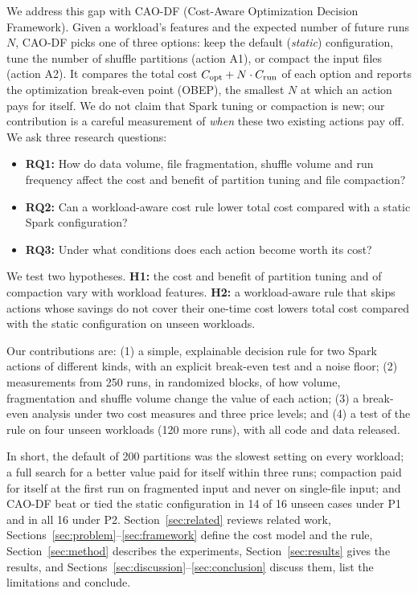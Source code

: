 We address this gap with CAO-DF (Cost-Aware Optimization Decision Framework). Given a
workload's features and the expected number of future runs $N$, CAO-DF picks one of three
options: keep the default (\emph{static}) configuration, tune the number of shuffle partitions
(action A1), or compact the input files (action A2). It compares the total cost
$C_{\mathrm{opt}} + N \cdot C_{\mathrm{run}}$ of each option and reports the optimization break-even point (OBEP),
the smallest $N$ at which an action pays for itself. We do not claim that Spark tuning or
compaction is new; our contribution is a careful measurement of \emph{when} these two
existing actions pay off. We ask three research questions:
\begin{itemize}
  \item \textbf{RQ1:} How do data volume, file fragmentation, shuffle volume and run frequency
        affect the cost and benefit of partition tuning and file compaction?
  \item \textbf{RQ2:} Can a workload-aware cost rule lower total cost compared with a static
        Spark configuration?
  \item \textbf{RQ3:} Under what conditions does each action become worth its cost?
\end{itemize}
We test two hypotheses. \textbf{H1:} the cost and benefit of partition tuning and of
compaction vary with workload features. \textbf{H2:} a workload-aware rule that skips actions
whose savings do not cover their one-time cost lowers total cost compared with the static
configuration on unseen workloads.

\noindent Our contributions are: (1) a simple, explainable decision rule for two Spark actions
of different kinds, with an explicit break-even test and a noise floor; (2) measurements from
250 runs, in randomized blocks, of how volume, fragmentation and shuffle volume change the
value of each action; (3) a break-even analysis under two cost measures and three price
levels; and (4) a test of the rule on four unseen workloads (120 more runs), with all code and
data released.

In short, the default of 200 partitions was the slowest setting on every workload; a full
search for a better value paid for itself within three runs; compaction paid for itself at
the first run on fragmented input and never on single-file input; and CAO-DF beat or tied the
static configuration in 14 of 16 unseen cases under P1 and in all 16 under P2. Section~\ref{sec:related} reviews related work,
Sections~\ref{sec:problem}--\ref{sec:framework} define the cost model and the rule,
Section~\ref{sec:method} describes the experiments, Section~\ref{sec:results} gives the
results, and Sections~\ref{sec:discussion}--\ref{sec:conclusion} discuss them, list the
limitations and conclude.
